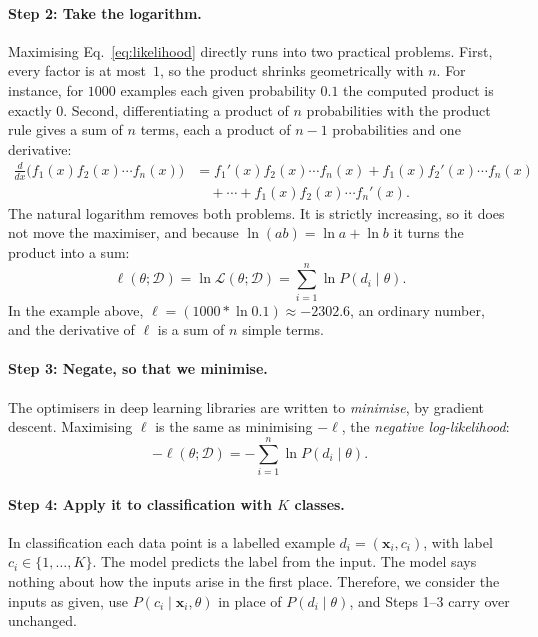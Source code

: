 \documentclass[12pt]{article}
\numberwithin{equation}{section} %
\newcommand{\vc}[1]{\symbf{#1}}
\begin{document}
\paragraph{Step 2: Take the logarithm.}
Maximising Eq.~\eqref{eq:likelihood} directly runs
into two practical problems. First, every factor is
at most~$1$, so the product shrinks geometrically with
$n$. For instance, for $1000$ examples each given
probability $0.1$ %
the computed product is exactly $0$. Second,
differentiating a product of $n$ probabilities with
the product rule gives a sum of $n$ terms,  each a
product of $n-1$ probabilities and one derivative:
\[
  \begin{aligned}
    \frac{d}{dx}\bigl(f_1(x)f_2(x)\cdots f_n(x)\bigr)
      &= f_1'(x)f_2(x)\cdots f_n(x)+f_1(x)f_2'(x)\cdots f_n(x)\\
      &\quad+\cdots+f_1(x)f_2(x)\cdots f_n'(x).
  \end{aligned}
\]
The natural logarithm removes both problems.
It is strictly increasing, so it
does not move the maximiser, and because
$\ln(ab)=\ln a+\ln b$ it turns the
product into a sum:
\begin{equation}\label{eq:loglik}
  \ell(\theta;\mathcal{D})=\ln\mathcal{L}(\theta;\mathcal{D})
    =\sum_{i=1}^{n}\ln P(d_i\mid\theta).
\end{equation}
In the example above,
$\ell=(1000 * \ln 0.1) \approx -2302.6$,
an ordinary number, and the derivative of
$\ell$ is a sum of $n$ simple terms.

\paragraph{Step 3: Negate, so that we minimise.}
The optimisers in deep learning libraries are written to \emph{minimise}, by gradient
descent. Maximising $\ell$ is the same as minimising $-\ell$, the
\emph{negative log-likelihood}:
\begin{equation}\label{eq:nll}
  -\ell(\theta;\mathcal{D})=-\sum_{i=1}^{n}\ln P(d_i\mid\theta).
\end{equation}

\paragraph{Step 4: Apply it to classification with $K$ classes.}
In classification each data point is a labelled
example $d_i=(\vc{x}_i,c_i)$, with label
$c_i\in\{1,\dots,K\}$. The model predicts the label
from the input. The model says nothing about how
the inputs arise in the first place. Therefore,
we consider the inputs as given, use
$P(c_i\mid\vc{x}_i,\theta)$ in place of
$P(d_i\mid\theta)$, and Steps 1--3 carry over
unchanged.
\end{document}
